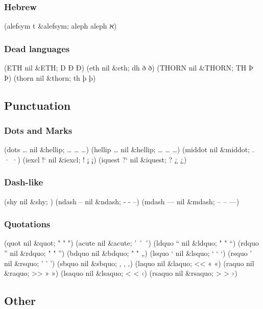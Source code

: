 \documentclass[11pt]{article}
\begin{document}
\subsubsection{Hebrew}
\label{sec-1-1-4}
(alefsym \aleph t \&alefsym; aleph aleph ℵ)

\subsubsection{Dead languages}
\label{sec-1-1-5}
(ETH \DH{} nil \&ETH; D Ð Ð)
(eth \dh{} nil \&eth; dh ð ð)
(THORN \TH{} nil \&THORN; TH Þ Þ)
(thorn \th{} nil \&thorn; th þ þ)

\subsection{Punctuation}
\label{sec-1-2}
\subsubsection{Dots and Marks}
\label{sec-1-2-1}
(dots \dots{} nil \&hellip; \ldots{} \ldots{} …)
(hellip \dots{} nil \&hellip; \ldots{} \ldots{} …)
(middot \textperiodcentered{} nil \&middot; . · ·)
(iexcl !` nil \&iexcl; ! ¡ ¡)
(iquest ?` nil \&iquest; ? ¿ ¿)

\subsubsection{Dash-like}
\label{sec-1-2-2}
(shy \- nil \&shy;   )
(ndash -- nil \&ndash; - - –)
(mdash --- nil \&mdash; -- -- —)

\subsubsection{Quotations}
\label{sec-1-2-3}
(quot \textquotedbl{} nil \&quot; " " ")
(acute \textasciiacute{} nil \&acute; ' ´ ´)
(ldquo \textquotedblleft{} nil \&ldquo; " " “)
(rdquo \textquotedblright{} nil \&rdquo; " " ”)
(bdquo \quotedblbase{} nil \&bdquo; " " „)
(lsquo \textquoteleft{} nil \&lsquo; ` ` ‘)
(rsquo \textquoteright{} nil \&rsquo; ' ' ’)
(sbquo \quotesinglbase{} nil \&sbquo; , , ‚)
(laquo \guillemotleft{} nil \&laquo; << « «)
(raquo \guillemotright{} nil \&raquo; >> » »)
(lsaquo \guilsinglleft{} nil \&lsaquo; < < ‹)
(rsaquo \guilsinglright{} nil \&rsaquo; > > ›)

\subsection{Other}
\label{sec-1-3}
\end{document}
